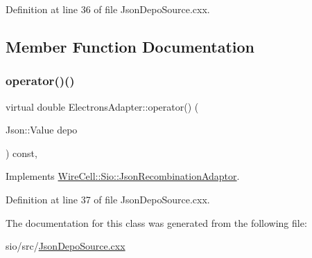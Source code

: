 Definition at line 36 of file Json\+Depo\+Source.\+cxx.



\subsection{Member Function Documentation}
\mbox{\label{class_electrons_adapter_a1480df3bcb8fdfb34608f2397782a7ee}} 
\subsubsection{\texorpdfstring{operator()()}{operator()()}}
{\footnotesize\ttfamily virtual double Electrons\+Adapter\+::operator() (\begin{DoxyParamCaption}\item[{Json\+::\+Value}]{depo }\end{DoxyParamCaption}) const\hspace{0.3cm}{\ttfamily [inline]}, {\ttfamily [virtual]}}



Implements \hyperlink{class_sio_1_1_json_recombination_adaptor_abb1bebe500df507e3e9662e0026b7025}{Wire\+Cell\+::\+Sio\+::\+Json\+Recombination\+Adaptor}.



Definition at line 37 of file Json\+Depo\+Source.\+cxx.



The documentation for this class was generated from the following file\+:\begin{DoxyCompactItemize}
\item 
sio/src/\hyperlink{_json_depo_source_8cxx}{Json\+Depo\+Source.\+cxx}\end{DoxyCompactItemize}
